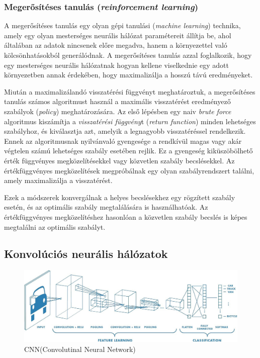 \documentclass[12pt,a4]{article}
\begin{document}
	\subsubsection{Megerősítéses tanulás (\textit{reinforcement learning})}
	
	A megerősítéses tanulás \cite{krenker} egy olyan gépi tanulási (\textit{machine learning}) technika, amely egy olyan
	mesterséges neurális hálózat paramétereit állítja be, ahol általában az adatok nincsenek előre megadva, hanem a környezettel való kölcsönhatásokból generálódnak. A megerősítéses tanulás azzal foglalkozik, hogy egy mesterséges neurális hálózatnak hogyan kellene viselkednie egy adott környezetben annak érdekében, hogy maximalizálja a hosszú távú 
	eredményeket.
	
	Miután a maximalizálandó visszatérési függvényt meghatároztuk, a megerősítéses tanulás számos algoritmust használ a maximális visszatérést eredményező szabályok (\textit{policy}) meghatározására. Az első lépésben egy naiv \textit{brute force} algoritmus kiszámítja a \textit{visszatérési függvény}t (\textit{return function}) minden lehetséges szabályhoz, és kiválasztja azt, amelyik a legnagyobb visszatéréssel rendelkezik. Ennek az algoritmusnak nyilvánvaló gyengesége a rendkívül magas vagy akár végtelen számú lehetséges szabály esetében rejlik. Ez a gyengeség kiküszöbölhető érték függvényes megközelítésekkel vagy közvetlen szabály becslésekkel. Az értékfüggvényes megközelítések megpróbálnak
	egy olyan szabályrendszert találni, amely maximalizálja a visszatérést.
	
	Ezek a módszerek konvergálnak a helyes becslésekhez egy rögzített szabály esetén, és az optimális szabály megtalálására is használhatóak. Az értékfüggvényes megközelítéshez hasonlóan a közvetlen szabály becslés is képes megtalálni az optimális szabályt.
	
	\subsection{Konvolúciós neurális hálózatok}
	\begin{figure}[h]	
		\centering
		\includegraphics[width=1\linewidth]{CNN}
		\caption{CNN(Convolutinal Neural Network)}
	\end{figure}
	
\end{document}

